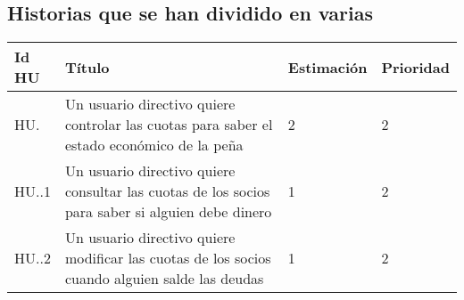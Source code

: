 \documentclass[11pt]{article}
\begin{document}
\subsection{Historias que se han dividido en varias}
\begin{table}[H]
  \centering
  \begin{tabular}{p{0.1\linewidth}p{0.7\linewidth}p{0.15\linewidth}p{0.15\linewidth}}
    \toprule
    \textbf{Id HU} & \textbf{Título} & \textbf{Estimación} & \textbf{Prioridad}\\
    \midrule
    HU. & Un usuario directivo quiere controlar las cuotas para saber el estado económico de la peña & 2 & 2\\
	HU..1 & Un usuario directivo quiere consultar las cuotas de los socios para saber si alguien debe dinero & 1 & 2\\
	HU..2 & Un usuario directivo quiere modificar las cuotas de los socios cuando alguien salde las deudas & 1 & 2\\
    \bottomrule
  \end{tabular}
  
\end{table}
\end{document}
